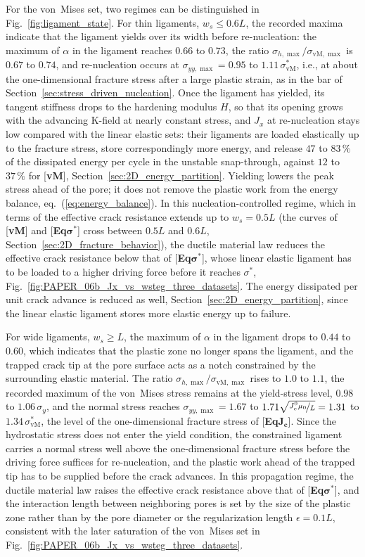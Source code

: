 \documentclass[pdflatex,sn-mathphys-num]{sn-jnl}%
\newcommand{\vMLabel}{[\textbf{vM}]\xspace}
\newcommand{\EqJcLabel}{[\textbf{Eq$\boldsymbol{J_c}$}]\xspace}
\newcommand{\EqSigmaStarLabel}{[\textbf{Eq$\boldsymbol{\sigma^*}$}]\xspace}
\theoremstyle{thmstyleone}%
\theoremstyle{thmstyletwo}%
\theoremstyle{thmstylethree}%
\begin{document}
For the von~Mises set, two regimes can be distinguished in Fig.~\ref{fig:ligament_state}. For thin ligaments, $w_s \le 0.6L$, the recorded maxima indicate that the ligament yields over its width before re-nucleation: the maximum of $\alpha$ in the ligament reaches $0.66$ to $0.73$, the ratio $\sigma_{h,\max}/\sigma_{\text{vM},\max}$ is $0.67$ to $0.74$, and re-nucleation occurs at $\sigma_{yy,\max} = 0.95$ to $1.11\,\sigma^*_{\text{vM}}$, i.e., at about the one-dimensional fracture stress after a large plastic strain, as in the bar of Section~\ref{sec:stress_driven_nucleation}. Once the ligament has yielded, its tangent stiffness drops to the hardening modulus $H$, so that its opening grows with the advancing K-field at nearly constant stress, and $J_x$ at re-nucleation stays low compared with the linear elastic sets: their ligaments are loaded elastically up to the fracture stress, store correspondingly more energy, and release $47$ to $83\,\%$ of the dissipated energy per cycle in the unstable snap-through, against $12$ to $37\,\%$ for \vMLabel, Section~\ref{sec:2D_energy_partition}. Yielding lowers the peak stress ahead of the pore; it does not remove the plastic work from the energy balance, eq.~(\ref{eq:energy_balance}). In this nucleation-controlled regime, which in terms of the effective crack resistance extends up to $w_s = 0.5L$ (the curves of \vMLabel and \EqSigmaStarLabel cross between $0.5L$ and $0.6L$, Section~\ref{sec:2D_fracture_behavior}), the ductile material law reduces the effective crack resistance below that of \EqSigmaStarLabel, whose linear elastic ligament has to be loaded to a higher driving force before it reaches $\sigma^*$, Fig.~\ref{fig:PAPER_06b_Jx_vs_wsteg_three_datasets}. The energy dissipated per unit crack advance is reduced as well, Section~\ref{sec:2D_energy_partition}, since the linear elastic ligament stores more elastic energy up to failure.

For wide ligaments, $w_s \ge L$, the maximum of $\alpha$ in the ligament drops to $0.44$ to $0.60$, which indicates that the plastic zone no longer spans the ligament, and the trapped crack tip at the pore surface acts as a notch constrained by the surrounding elastic material. The ratio $\sigma_{h,\max}/\sigma_{\text{vM},\max}$ rises to $1.0$ to $1.1$, the recorded maximum of the von~Mises stress remains at the yield-stress level, $0.98$ to $1.06\,\sigma_y$, and the normal stress reaches $\sigma_{yy,\max} = 1.67$ to $1.71\sqrt{\nicefrac{J_c^0\mu_0}{L}} = 1.31$ to $1.34\,\sigma^*_{\text{vM}}$, the level of the one-dimensional fracture stress of \EqJcLabel. Since the hydrostatic stress does not enter the yield condition, the constrained ligament carries a normal stress well above the one-dimensional fracture stress before the driving force suffices for re-nucleation, and the plastic work ahead of the trapped tip has to be supplied before the crack advances. In this propagation regime, the ductile material law raises the effective crack resistance above that of \EqSigmaStarLabel, and the interaction length between neighboring pores is set by the size of the plastic zone rather than by the pore diameter or the regularization length $\epsilon = 0.1L$, consistent with the later saturation of the von~Mises set in Fig.~\ref{fig:PAPER_06b_Jx_vs_wsteg_three_datasets}.
\end{document}
